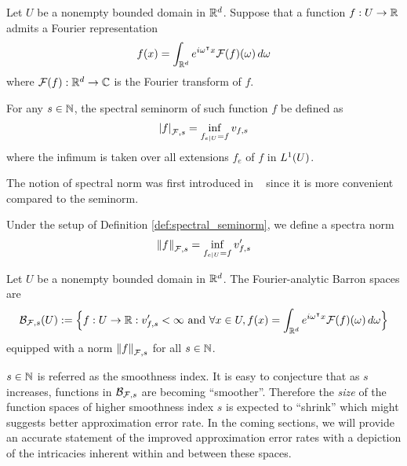 \begin{definition}
    \label{def:spectral_seminorm}
    Let $U$ be a nonempty bounded domain in $\mathbb{R}^d$. Suppose that a function $f:
    U \to \mathbb{R}$ admits a Fourier representation
    \begin{equation}
        f(x) = \int_{\mathbb{R}^d} e^{i\omega{}^{\intercal} x} \mathcal{F}(f)(\omega) \,d\omega
    \end{equation}
    where $\mathcal{F}(f): \mathbb{R}^d \to \mathbb{C}$ is the Fourier transform of $f$.

    For any $s \in \mathbb{N}$, the spectral seminorm of such function $f$ be defined
    as
    \begin{equation}
        \left| f \right|_{\mathcal{F}, {s}} = \inf_{f_{e\mid U} = f} v_{f,s}
    \end{equation}
    where the infimum is taken over all extensions $f_e$ of $f$ in $L^{1}(U)$.
\end{definition}


The notion of spectral norm was first introduced in
~\cite{siegelApproximationRatesNeural2021} since it is more convenient compared
to the seminorm.

\begin{definition}
    \label{def:spectral_norm}
    Under the setup of Definition \ref{def:spectral_seminorm}, we define a
    spectra norm
    \begin{equation}
        \left\| f \right\|_{\mathcal{F}, {s}} = \inf_{f_{e\mid U} = f} v'_{f,s}
    \end{equation}
\end{definition}

\begin{definition}
    \label{def:fourier_space}
    Let $U$ be a nonempty bounded domain in $\mathbb{R}^d$. The Fourier-analytic Barron
    spaces are
    \begin{equation}
        \mathcal{B}_{\mathcal{F},s}(U) := \Big\{
            f: U \to \mathbb{R}: v'_{f,s} < \infty  \textnormal{ and }
            \forall x\in U, 
                f(x) = \int_{\mathbb{R}^d} e^{i\omega{}^{\intercal} x} \mathcal{F}(f)(\omega)\,d\omega
        \Big\}
    \end{equation}
    equipped with a norm $\left\| f \right\|_{\mathcal{F}, {s}}$ for all $s \in \mathbb{N}$.
\end{definition}

$s \in \mathbb{N}$ is referred as the smoothness index. It is easy to conjecture
that as $s$ increases, functions in $\mathcal{B}_{\mathcal{F}, s}$ are becoming
``smoother''. Therefore the \textit{size} of the function spaces of higher
smoothness index $s$ is expected to ``shrink'' which might suggests better
approximation error rate. In the coming sections, we will provide an accurate
statement of the improved approximation error rates with a depiction of the
intricacies inherent within and between these spaces.

